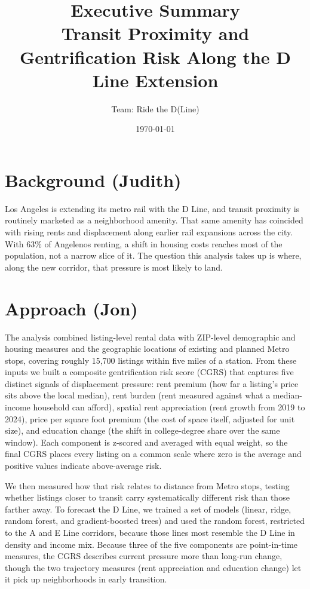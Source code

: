 \documentclass[11pt, letterpaper]{article}
\title{\textbf{Executive Summary}\\[0.5em]
\large Transit Proximity and Gentrification Risk Along the D Line Extension}
\date{\today}
\author{Team: Ride the D(Line)}
\begin{document}
\maketitle
\thispagestyle{empty}

\tableofcontents

\section{Background (Judith)}

Los Angeles is extending its metro rail with the D Line, and transit proximity is routinely marketed
as a neighborhood amenity. That same amenity has coincided with rising rents and displacement along
earlier rail expansions across the city. With 63\% of Angelenos renting, a shift in housing costs
reaches most of the population, not a narrow slice of it. The question this analysis takes up is
where, along the new corridor, that pressure is most likely to land.

\section{Approach (Jon)}

The analysis combined listing-level rental data with ZIP-level demographic and housing measures and
the geographic locations of existing and planned Metro stops, covering roughly 15,700 listings within
five miles of a station. From these inputs we built a composite gentrification risk score (CGRS) that
captures five distinct signals of displacement pressure: rent premium (how far a listing's price sits
above the local median), rent burden (rent measured against what a median-income household can
afford), spatial rent appreciation (rent growth from 2019 to 2024), price per square foot premium
(the cost of space itself, adjusted for unit size), and education change (the shift in college-degree
share over the same window). Each component is z-scored and averaged with equal weight, so the final
CGRS places every listing on a common scale where zero is the average and positive values indicate
above-average risk.

We then measured how that risk relates to distance from Metro stops, testing whether listings closer
to transit carry systematically different risk than those farther away. To forecast the D Line, we
trained a set of models (linear, ridge, random forest, and gradient-boosted trees) and used the
random forest, restricted to the A and E Line corridors, because those lines most resemble the D Line
in density and income mix. Because three of the five components are point-in-time measures, the CGRS
describes current pressure more than long-run change, though the two trajectory measures (rent
appreciation and education change) let it pick up neighborhoods in early transition.
\end{document}
